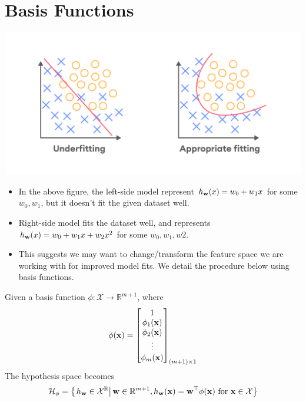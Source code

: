 
\newpage
\section{Basis Functions}

\begin{center}
  \includegraphics[scale=0.25]{images/03.png}
\end{center}

\begin{itemize}
  \item In the above figure, the left-side model represent  \( h_{\mathbf{w}}(x) = w_0 + w_1x \) for some \(w_0, w_1\), but it doesn't fit the given dataset well.
  \item Right-side model fits the dataset well, and represents \( h_{\mathbf{w}}(x) = w_0 + w_1x + w_2x^2 \) for some \(w_0, w_1, w2\).
  \item This suggests we may want to change/transform the feature space we are working with for improved model fits. We detail the procedure below using basis functions.
\end{itemize}

Given a basis function $\phi:\mathcal{X}\rightarrow \mathbb{R}^{m + 1}$, where
\begin{align*}
  \phi(\mathbf{x}) =
  \begin{bmatrix}
    1          \\
    \phi_1(\mathbf{x}) \\
    \phi_2(\mathbf{x}) \\
    \vdots     \\
    \phi_m(\mathbf{x})
  \end{bmatrix}_{(m + 1)\times 1}
\end{align*}
The hypothesis space becomes
\begin{align*}
  \mathcal{H}_\phi = \left\{\left.h_\mathbf{w} \in \mathcal{X}^\mathbb{R}\right|\mathbf{w}\in\mathbb{R}^{m + 1}, h_\mathbf{w}(\mathbf{x}) = \mathbf{w}^\top\phi(\mathbf{x})\text{ for }\mathbf{x} \in \mathcal{X}\right\}
\end{align*}

